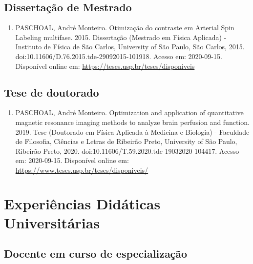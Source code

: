 \documentclass[a4paper,oneside,10pt]{article}
\begin{document}
\subsection{Dissertação de Mestrado}
\vspace{0.3cm}

\begin{enumerate}
\renewcommand{\labelenumi}{{\large\bfseries\arabic{enumi}.}}

        \item PASCHOAL, André Monteiro. Otimização do contraste em Arterial Spin Labeling multifase. 2015. Dissertação (Mestrado em Física Aplicada) - Instituto de Física de São Carlos, University of São Paulo, São Carlos, 2015. doi:10.11606/D.76.2015.tde-29092015-101918. Acesso em: 2020-09-15. Disponível online em: \url{https://teses.usp.br/teses/disponiveis}

\end{enumerate}

\subsection{Tese de doutorado}
\vspace{0.3cm}

\begin{enumerate}
\renewcommand{\labelenumi}{{\large\bfseries\arabic{enumi}.}}

        \item PASCHOAL, André Monteiro. Optimization and application of quantitative magnetic resonance imaging methods to analyze brain perfusion and function. 2019. Tese (Doutorado em Física Aplicada à Medicina e Biologia) - Faculdade de Filosofia, Ciências e Letras de Ribeirão Preto, University of São Paulo, Ribeirão Preto, 2020. doi:10.11606/T.59.2020.tde-19032020-104417. Acesso em: 2020-09-15. Disponível online em: \url{https://www.teses.usp.br/teses/disponiveis/}

\end{enumerate}

\newpage
\section{Experiências Didáticas Universitárias}

\subsection{Docente em curso de especialização}
\end{document}
